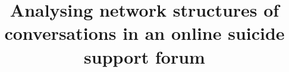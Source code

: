 \documentclass[fleqn,10pt]{wlscirep} %
\title{Analysing network structures of conversations in an online suicide support forum}
\author{}
\begin{document}
\flushbottom
\maketitle






% 



\end{document}
